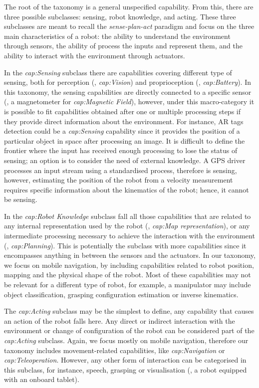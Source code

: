 The root of the taxonomy is a general unspecified capability. From this, there are three possible subclasses: sensing, robot knowledge, and acting. These three subclasses are meant to recall the \textit{sense-plan-act} paradigm and focus on the three main characteristics of a robot: the ability to understand the environment through sensors, the ability of process the inputs and represent them, and the ability to interact with the environment through actuators.

In the \textit{cap:Sensing} subclass there are capabilities covering different type of sensing, both for perception (\eg, \textit{cap:Vision}) and proprioception (\eg, \textit{cap:Battery}). In this taxonomy, the sensing capabilities are directly connected to a specific sensor (\eg, a magnetometer for \textit{cap:Magnetic Field}), however, under this macro-category it is possible to fit capabilities obtained after one or multiple processing steps if they provide direct information about the environment. For instance, AR tags detection could be a \textit{cap:Sensing} capability since it provides the position of a particular object in space after processing an image. It is difficult to define the frontier where the input has received enough processing to lose the status of sensing; an option is to consider the need of external knowledge.  A GPS driver processes an input stream using a standardised process, therefore is sensing, however, estimating the position of the robot from a velocity measurement requires specific information about the kinematics of the robot; hence, it cannot be sensing.

In the \textit{cap:Robot Knowledge} subclass fall all those capabilities that are related to any internal representation used by the robot (\eg, \textit{cap:Map representation}), or any intermediate processing necessary to achieve the interaction with the environment (\eg, \textit{cap:Planning}). This is potentially the subclass with more capabilities since it encompasses anything in between the sensors and the actuators. In our taxonomy, we focus on mobile navigation, by including capabilities related to robot position, mapping and the physical shape of the robot. Most of these capabilities may not be relevant for a different type of robot, for example, a manipulator may include object classification, grasping configuration estimation or inverse kinematics.

The \textit{cap:Acting} subclass may be the simplest to define, any capability that causes an action of the robot falls here. Any direct or indirect interaction with the environment or change of configuration of the robot can be considered part of the \textit{cap:Acting} subclass. Again, we focus mostly on mobile navigation, therefore our taxonomy includes movement-related capabilities, like \textit{cap:Navigation} or \textit{cap:Teleoperation}. However, any other form of interaction can be categorised in this subclass, for instance, speech, grasping or visualisation (\eg, a robot equipped with an onboard tablet).

